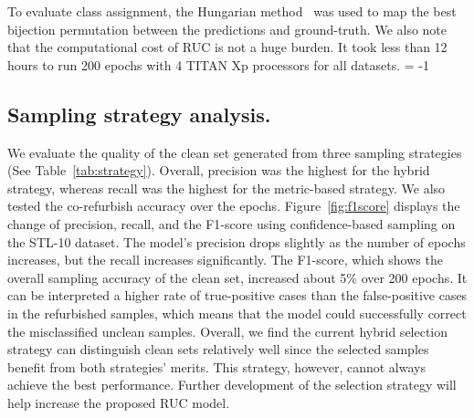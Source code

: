 \documentclass[final]{cvpr}
\newcommand{\model}{\textsf{RUC}}
\begin{document}
\begin{table}[!h]
\centering
{}
\caption{List of transformations used in RandAugment}
\label{Tab:Strong_aug}
\end{table}

To evaluate class assignment, the Hungarian method~\cite{kuhn1955hungarian} was used to map the best bijection permutation between the predictions and ground-truth. We also note that the computational cost of \model{} is not a huge burden. It took less than 12 hours to run 200 epochs with 4 TITAN Xp processors for all datasets. \looseness = -1



\subsection{Sampling strategy analysis.}

We evaluate the quality of the clean set generated from three sampling strategies (See Table~\ref{tab:strategy}). Overall, precision was the highest for the hybrid strategy, whereas recall was the highest for the metric-based strategy. We also tested the co-refurbish accuracy over the epochs. Figure~\ref{fig:f1score} displays the change of precision, recall, and the F1-score using confidence-based sampling on the STL-10 dataset. The model's precision drops slightly as the number of epochs increases, but the recall increases significantly. The F1-score, which shows the overall sampling accuracy of the clean set, increased about 5\% over 200 epochs. It can be interpreted a higher rate of true-positive cases than the false-positive cases in the refurbished samples, which means that the model could successfully correct the misclassified unclean samples. Overall, we find the current hybrid selection strategy can distinguish clean sets relatively well since the selected samples benefit from both strategies' merits. This strategy, however, cannot always achieve the best performance. Further development of the selection strategy will help increase the proposed \model{} model.
\end{document}
